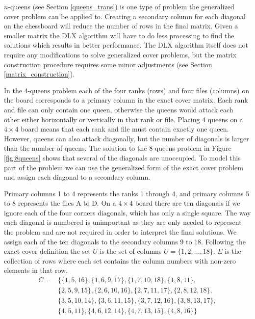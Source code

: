 $n$-queens (see Section \ref{queens_trans}) is one type of problem the generalized cover problem can be applied to.
Creating a secondary column for each diagonal on the chessboard will reduce the number of rows in the final matrix.
Given a smaller matrix the DLX algorithm will have to do less processing to find the solutions which results in better performance.
The DLX algorithm itself does not require any modifications to solve generalized cover problems, but the matrix construction procedure requires some minor adjustments (see Section \ref{matrix_construction}).

\begin{example}
In the 4-queens problem each of the four ranks (rows) and four files (columns) on the board corresponds to a primary column in the exact cover matrix.
Each rank and file can only contain one queen, otherwise the queens would attack each other either horizontally or vertically in that rank or file.
Placing 4 queens on a $4 \times 4$ board means that each rank and file must contain exactly one queen.
However, queens can also attack diagonally, but the number of diagonals is larger than the number of queens.
The solution to the 8-queens problem in Figure \ref{fig:8queens} shows that several of the diagonals are unoccupied.
To model this part of the problem we can use the generalized form of the exact cover problem and assign each diagonal to a secondary column.

Primary columns 1 to 4 represents the ranks 1 through 4, and primary columns 5 to 8 represents the files A to D.
On a $4 \times 4$ board there are ten diagonals if we ignore each of the four corners diagonals, which has only a single square.
The way each diagonal is numbered is unimportant as they are only needed to represent the problem and are not required in order to interpret the final solutions.
We assign each of the ten diagonals to the secondary columns 9 to 18.
Following the exact cover definition the set $U$ is the set of columns $U = \{ 1, 2, \ldots, 18 \}$.
$E$ is the collection of rows where each set contains the column numbers with non-zero elements in that row.
\begin{align*}
C =& \{ \{ 1, 5, 16 \}, \{ 1, 6, 9, 17 \}, \{ 1, 7, 10, 18 \}, \{ 1, 8, 11 \}, \\
&\{ 2, 5, 9, 15 \}, \{ 2, 6, 10, 16 \}, \{ 2, 7, 11, 17 \}, \{ 2, 8, 12, 18 \}, \\
&\{ 3, 5, 10, 14 \}, \{ 3, 6, 11, 15 \}, \{ 3, 7, 12, 16 \}, \{ 3, 8, 13, 17 \}, \\
&\{ 4, 5, 11 \}, \{ 4, 6, 12, 14 \}, \{ 4, 7, 13, 15 \}, \{ 4, 8, 16 \} \}
\end{align*}


\end{example}
